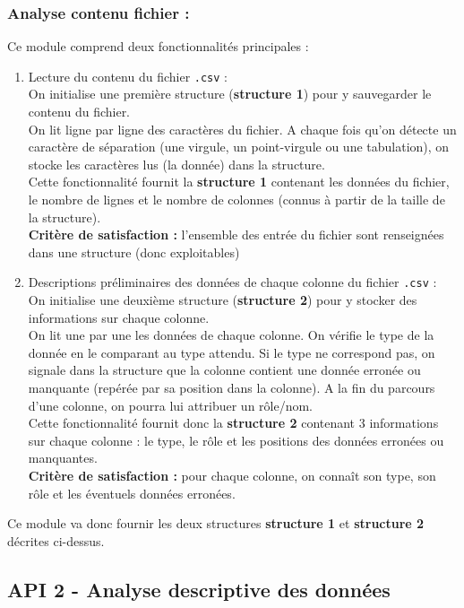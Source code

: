 			\subsubsection{Analyse contenu fichier :}
				Ce module comprend deux fonctionnalités principales :
				\begin{enumerate}
					\item Lecture du contenu du fichier \lstinline!.csv! :\\
					On initialise une première structure (\textbf{structure 1}) pour y sauvegarder le contenu du fichier.\\
					On lit ligne par ligne des caractères du fichier. A chaque fois qu'on détecte un caractère de séparation (une virgule, un point-virgule ou une tabulation), on stocke les caractères lus (la donnée) dans la structure.\\
					Cette fonctionnalité fournit la \textbf{structure 1} contenant les données du fichier, le nombre de lignes et le nombre de colonnes (connus à partir de la taille de la structure).\\
					\textbf{Critère de satisfaction : } l'ensemble des entrée du fichier sont renseignées dans une structure (donc exploitables)
					\item Descriptions préliminaires des données de chaque colonne du fichier \lstinline!.csv! :\\
					On initialise une deuxième structure (\textbf{structure 2}) pour y stocker des informations sur chaque colonne.\\
					On lit une par une les données de chaque colonne. On vérifie le type de la donnée en le comparant au type attendu. Si le type ne correspond pas, on signale dans la structure que la colonne contient une donnée erronée ou manquante (repérée par sa position dans la colonne). A la fin du parcours d'une colonne, on pourra lui attribuer un rôle/nom.\\
					Cette fonctionnalité fournit donc la \textbf{structure 2} contenant 3 informations sur chaque colonne : le type, le rôle et les positions des données erronées ou manquantes.\\
					\textbf{Critère de satisfaction : } pour chaque colonne, on connaît son type, son rôle et les éventuels données erronées.
				\end{enumerate}
				Ce module va donc fournir les deux structures \textbf{structure 1} et \textbf{structure 2} décrites ci-dessus.
				
		\subsection{API 2 - Analyse descriptive des données}
